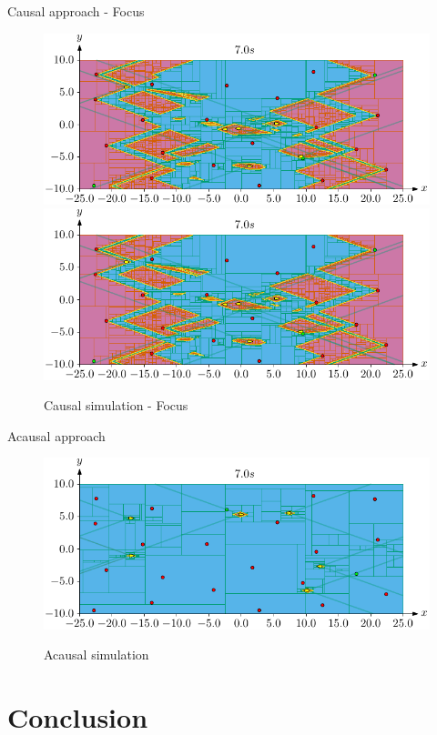 \documentclass{beamer}
\begin{document}
        \begin{frame}{Causal approach - Focus}
            \begin{figure}
                \centering
                \begin{overprint}
                        \href{run:causal.mp4?autostart&loop&start=7&stop=10}{\includegraphics[width=\textwidth]{imgs/causal_cover}}
                        \href{run:causal.mp4?autostart&loop&start=45&stop=50}{\includegraphics[width=\textwidth]{imgs/causal_cover}}
                \end{overprint}
                \caption{Causal simulation - Focus}
            \end{figure}
        \end{frame}

        \begin{frame}{Acausal approach}
            \begin{figure}
                \centering
                \href{run:acausal.mp4?autostart}{\includegraphics[width=\textwidth]{imgs/acausal_cover}}
                \caption{Acausal simulation}
            \end{figure}
        \end{frame}

    \section{Conclusion}
\end{document}
